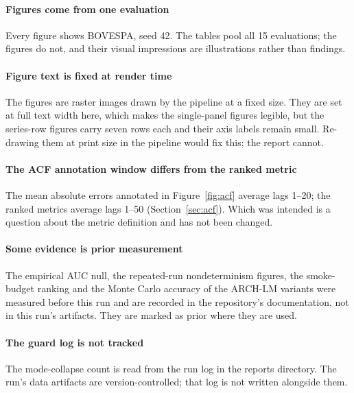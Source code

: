 \documentclass[11pt,a4paper]{article}
\makeatletter
\DeclareRobustCommand{\_}{\ifmmode\nfss@text{\textunderscore}\else\textunderscore\allowbreak\fi}
\makeatother
\begin{document}
\paragraph{Figures come from one evaluation} Every figure shows BOVESPA, seed 42. The tables pool all 15 evaluations; the figures do not, and their visual impressions are illustrations rather than findings.

\paragraph{Figure text is fixed at render time} The figures are raster images drawn by the pipeline at a fixed size. They are set at full text width here, which makes the single-panel figures legible, but the series-row figures carry seven rows each and their axis labels remain small. Re-drawing them at print size in the pipeline would fix this; the report cannot.

\paragraph{The ACF annotation window differs from the ranked metric} The mean absolute errors annotated in Figure~\ref{fig:acf} average lags 1--20; the ranked metrics average lags 1--50 (Section~\ref{sec:acf}). Which was intended is a question about the metric definition and has not been changed.

\paragraph{Some evidence is prior measurement} The empirical AUC null, the repeated-run nondeterminism figures, the smoke-budget ranking and the Monte Carlo accuracy of the ARCH-LM variants were measured before this run and are recorded in the repository's documentation, not in this run's artifacts. They are marked as prior where they are used.

\paragraph{The guard log is not tracked} The mode-collapse count is read from the run log in the reports directory. The run's data artifacts are version-controlled; that log is not written alongside them.

\end{document}
